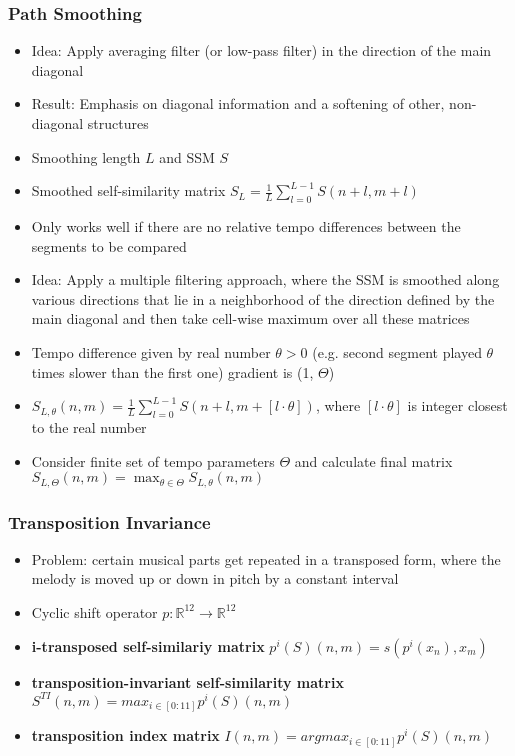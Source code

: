 \documentclass{scrartcl}
\newcommand{\ffrac}[2]{\ensuremath{\frac{\displaystyle #1}{\displaystyle #2}}}
\begin{document}
\subsubsection*{Path Smoothing}
\begin{itemize}
    \item
        Idea: Apply averaging filter (or low-pass filter) in the direction of the main diagonal
    \item
        Result: Emphasis on diagonal information and a softening of other, non-diagonal structures\\
    
    \item
        Smoothing length $L$ and SSM $S$
    \item
        Smoothed self-similarity matrix $S_L = \ffrac{1}{L} \sum_{l=0}^{L-1} S(n+l, m+l)$
    \item
        Only works well if there are no relative tempo differences between the segments to be compared\\
    \item
        Idea: Apply a multiple filtering approach, where the SSM is smoothed along various directions that lie in a neighborhood of the direction defined by the main diagonal and then take cell-wise maximum over all these matrices
    \item
        Tempo difference given by real number $\theta > 0$ (e.g. second segment played $\theta$ times slower than the first one) gradient is (1, $\Theta$)
    \item
        $S_{L, \theta} (n,m) = \ffrac{1}{L}\sum_{l=0}^{L-1} S(n+l, m+[l\cdot \theta])$, where $[l\cdot \theta]$ is integer closest to the real number
    \item
        Consider finite set of tempo parameters $\Theta$ and calculate final matrix $S_{L, \Theta}(n,m) = \max_{\theta \in \Theta} S_{L, \theta}(n,m) $
\end{itemize}

\subsubsection*{Transposition Invariance}
\begin{itemize}
    \item
        Problem: certain musical parts get repeated in a transposed form, where the melody is moved up or down in pitch by a constant interval
    \item
        Cyclic shift operator $p: \mathbb{R}^{12} \rightarrow \mathbb{R}^{12}$
    \item
        \textbf{i-transposed self-similariy matrix} $p^i(S)(n,m) = s(p^i(x_n), x_m)$
    \item
        \textbf{transposition-invariant self-similarity matrix} $S^{TI}(n,m) = max_{i \in [0:11]}p^i(S)(n,m)$
    \item
        \textbf{transposition index matrix} $I(n,m) = argmax_{i \in [0:11]} p^i(S)(n,m)$
\end{itemize}
\end{document}
